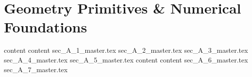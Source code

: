\chapter{Geometry Primitives \& Numerical Foundations}
\label{ch:geometry_primitives}

{content}
{content}
{sec_A_1_master.tex}
{sec_A_2_master.tex}
{sec_A_3_master.tex}
{sec_A_4_master.tex}
{sec_A_5_master.tex}
{content}
{content}
{sec_A_6_master.tex}
{sec_A_7_master.tex}